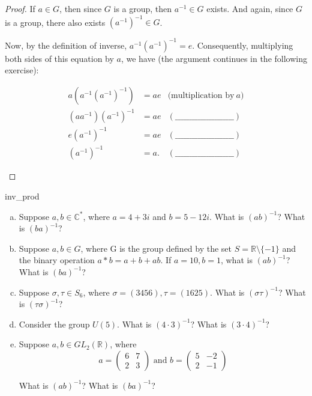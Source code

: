 \begin{proof}
If $a \in G$, then since $G$ is a group, then $a^{-1} \in G$ exists.  And again, since $G$ is a group, there also exists $(a^{-1})^{-1} \in G$.

Now, by the definition of inverse, $a^{-1} (a^{-1})^{-1} = e$. Consequently, multiplying both sides of this equation by $a$, we have  (the argument continues in the following exercise):

\begin{exercise}{44}
\begin{align*}
a(a^{-1}(a^{-1})^{-1}) & = ae &\mbox{(multiplication by}~a)\\
(aa^{-1})(a^{-1})^{-1} & = ae   &(\_\_\_\_\_\_\_\_\_\_\_\_\_\_\_\_\_\_\_\_\_) \\
e(a^{-1})^{-1} & = ae   &(\_\_\_\_\_\_\_\_\_\_\_\_\_\_\_\_\_\_\_\_\_) \\
(a^{-1})^{-1} &= a.  &(\_\_\_\_\_\_\_\_\_\_\_\_\_\_\_\_\_\_\_\_\_)
\end{align*}
\end{exercise}
\end{proof}

\begin{exercise}{inv_prod}
\begin{enumerate}[(a)]
\item
Suppose $a,b \in {\mathbb C}^{\ast}$, where $a = 4 + 3i$ and $b = 5 - 12i$.  What is $(ab)^{-1}$?  What is $(ba)^{-1}$?
\item
Suppose $a,b \in G$, where G is the group defined by the set $S = {\mathbb R} \setminus \{ -1 \}$ and the binary operation $a \ast b = a + b +ab$.  If $a = 10, b = 1$, what is $(ab)^{-1}$?  What is $(ba)^{-1}$?
\item
Suppose $\sigma, \tau \in S_6$, where $\sigma = (3456), \tau = (1625)$.  What is $(\sigma \tau)^{-1}$?  What is $(\tau \sigma)^{-1}$?
\item
Consider the group $U(5)$.  What is $(4 \cdot 3)^{-1}$?  What is $(3 \cdot 4)^{-1}$?
\item
Suppose $a, b \in GL_2({\mathbb R})$, where
\[
a = \begin{pmatrix}
6 & 7 \\
2 & 3
\end{pmatrix} \mbox{ and }
b = \begin{pmatrix}
5 & -2 \\
2 & -1
\end{pmatrix} \]

What is $(ab)^{-1}$?  What is $(ba)^{-1}$?
\end{enumerate}
\end{exercise}{}

